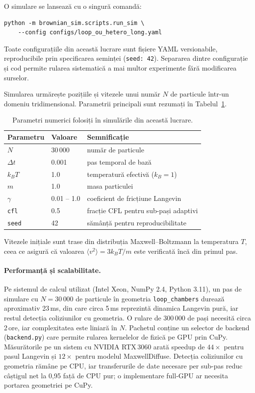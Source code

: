 \documentclass[12pt,openright,twoside]{book}
\begin{document}
O simulare se lansează cu o singură comandă:

\begin{verbatim}
python -m brownian_sim.scripts.run_sim \
    --config configs/loop_ou_hetero_long.yaml
\end{verbatim}

Toate configurațiile din această lucrare sunt fișiere YAML versionabile, reproducibile prin specificarea seminței (\texttt{seed: 42}). Separarea dintre configurație și cod permite rularea sistematică a mai multor experimente fără modificarea surselor.

Simularea urmărește pozițiile și vitezele unui număr $N$ de particule într-un domeniu tridimensional. Parametrii principali sunt rezumați în Tabelul~\ref{tab:params}.

\begin{table}[ht]
\centering
\begin{tabular}{lll}
\toprule
Parametru & Valoare & Semnificație \\
\midrule
$N$ & 30\,000 & număr de particule \\
$\Delta t$ & 0.001 & pas temporal de bază \\
$k_B T$ & 1.0 & temperatură efectivă ($k_B = 1$) \\
$m$ & 1.0 & masa particulei \\
$\gamma$ & 0.01 -- 1.0 & coeficient de fricțiune Langevin \\
\texttt{cfl} & 0.5 & fracție CFL pentru sub-pași adaptivi \\
\texttt{seed} & 42 & sămânță pentru reproducibilitate \\
\bottomrule
\end{tabular}
\caption{Parametri numerici folosiți în simulările din această lucrare.}
\label{tab:params}
\end{table}

Vitezele inițiale sunt trase din distribuția Maxwell--Boltzmann la temperatura $T$, ceea ce asigură că valoarea $\langle v^2 \rangle = 3k_BT/m$ este verificată încă din primul pas.

\paragraph{Performanță și scalabilitate.}
Pe sistemul de calcul utilizat (Intel Xeon, NumPy 2.4, Python 3.11), un pas de simulare cu $N=30\,000$ de particule în geometria \texttt{loop\_chambers} durează aproximativ 23\,ms, din care circa 5\,ms reprezintă dinamica Langevin pură, iar restul detecția coliziunilor cu geometria. O rulare de 300\,000 de pași necesită circa 2\,ore, iar complexitatea este liniară în $N$. Pachetul conține un selector de backend (\texttt{backend.py}) care permite rularea kernelelor de fizică pe GPU prin CuPy. Măsurătorile pe un sistem cu NVIDIA RTX\,3060 arată speedup de $44\times$ pentru pasul Langevin și $12\times$ pentru modelul MaxwellDiffuse. Detecția coliziunilor cu geometria rămâne pe CPU, iar transferurile de date necesare per sub-pas reduc câștigul net la 0{,}95 față de CPU pur; o implementare full-GPU ar necesita portarea geometriei pe CuPy.
\end{document}
